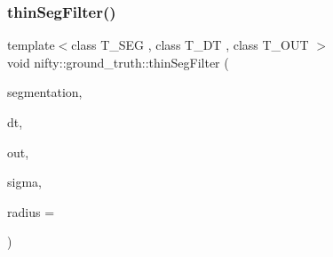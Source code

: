 \mbox{\label{namespacenifty_1_1ground__truth_a4feb2d90b357085dcc776da2e24a4f64}} 
\subsubsection{\texorpdfstring{thin\+Seg\+Filter()}{thinSegFilter()}}
{\footnotesize\ttfamily template$<$class T\+\_\+\+S\+EG , class T\+\_\+\+DT , class T\+\_\+\+O\+UT $>$ \\
void nifty\+::ground\+\_\+truth\+::thin\+Seg\+Filter (\begin{DoxyParamCaption}\item[{const \hyperlink{classandres_1_1View}{marray\+::\+View}$<$ T\+\_\+\+S\+EG $>$ \&}]{segmentation,  }\item[{const \hyperlink{classandres_1_1View}{marray\+::\+View}$<$ T\+\_\+\+DT $>$ \&}]{dt,  }\item[{\hyperlink{classandres_1_1View}{marray\+::\+View}$<$ T\+\_\+\+O\+UT $>$ \&}]{out,  }\item[{const float}]{sigma,  }\item[{int}]{radius = {} }\end{DoxyParamCaption})}

